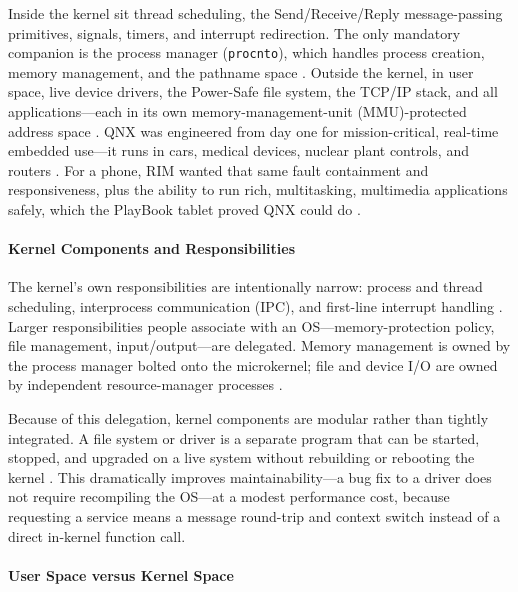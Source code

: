 Inside the kernel sit thread scheduling, the Send/Receive/Reply
message-passing primitives, signals, timers, and interrupt redirection.
The only mandatory companion is the process manager (\texttt{procnto}),
which handles process creation, memory management, and the pathname
space \citep{bb_microkernel_dev}. Outside the kernel, in user space,
live device drivers, the Power-Safe file system, the TCP/IP stack, and
all applications---each in its own memory-management-unit
(MMU)-protected address space \citep{bb_microkernel_dev, qnx_powersafe_fs,
qnx_neutrino_overview}. QNX was engineered from day one for
mission-critical, real-time embedded use---it runs in cars, medical
devices, nuclear plant controls, and routers
\citep{qnx_memman, qnx_ham}. For a phone, RIM wanted that same fault
containment and responsiveness, plus the ability to run rich,
multitasking, multimedia applications safely, which the PlayBook tablet
proved QNX could do \citep{crackberry_qnxhistory}.

\paragraph{Kernel Components and Responsibilities}

The kernel's own responsibilities are intentionally narrow: process and
thread scheduling, interprocess communication (IPC), and first-line
interrupt handling \citep{qnx_kernel_sysarch}. Larger responsibilities
people associate with an OS---memory-protection policy, file management,
input/output---are delegated. Memory management is owned by the process
manager bolted onto the microkernel; file and device I/O are owned by
independent resource-manager processes \citep{qnx_memman}.

Because of this delegation, kernel components are modular rather than
tightly integrated. A file system or driver is a separate program that
can be started, stopped, and upgraded on a live system without
rebuilding or rebooting the kernel
\citep{qnx_ham, qnx_neutrino_overview}. This dramatically improves
maintainability---a bug fix to a driver does not require recompiling the
OS---at a modest performance cost, because requesting a service means a
message round-trip and context switch instead of a direct in-kernel
function call.

\paragraph{User Space versus Kernel Space}

